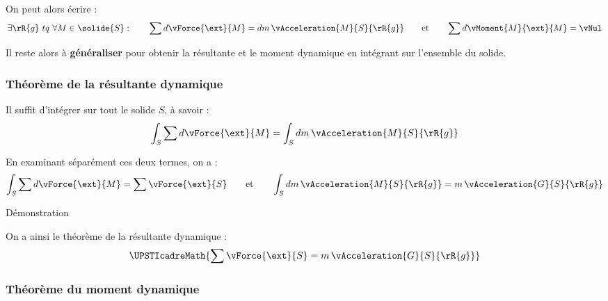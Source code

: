 \documentclass[11pt]{article}
\begin{document}
\noindent On peut alors écrire :
\[ \exists \rR{g}~ tq~ \forall M\in \solide{S}: \qquad \sum d\vForce{\ext}{M}=dm\,\vAcceleration{M}{S}{\rR{g}} \qquad \text{et} \qquad \sum d\vMoment{M}{\ext}{M}=\vNul \]

Il reste alors à \textbf{généraliser} pour obtenir la résultante et le moment dynamique en intégrant sur l'ensemble du solide.

\subsubsection{Théorème de la résultante dynamique}

Il suffit d'intégrer sur tout le solide $S$, à savoir :
\[ \int_S\sum d\vForce{\ext}{M}=\int_S dm\,\vAcceleration{M}{S}{\rR{g}} \]

En examinant séparément ces deux termes, on a : 
\[ \int_S\sum d\vForce{\ext}{M}=\sum\vForce{\ext}{S} \qquad \textrm{et} \qquad \int_S dm\,\vAcceleration{M}{S}{\rR{g}}=m\,\vAcceleration{G}{S}{\rR{g}} \]

\begin{bclogo}[logo=\bcbook,couleur=DarkOrange!5,arrondi=0.1,sousTitre=]{Démonstration}
{\vspace{20em}}
\end{bclogo}
 
On a ainsi le théorème de la résultante dynamique :
\[ \UPSTIcadreMath{\sum\vForce{\ext}{S}=m\,\vAcceleration{G}{S}{\rR{g}}} \]

\subsubsection{Théorème du moment dynamique}
\end{document}
